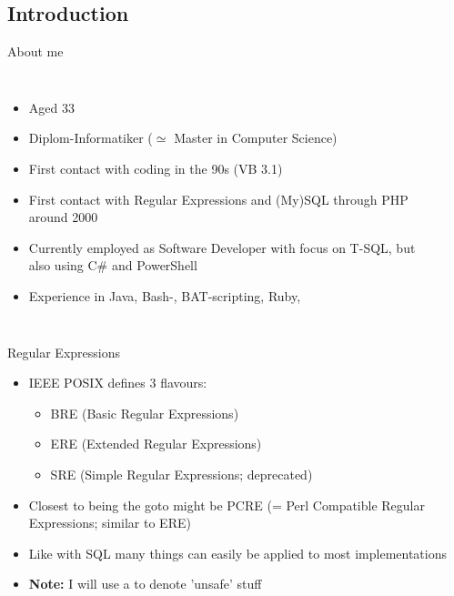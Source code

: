 \documentclass[english,aspectratio=169]{beamer}
\begin{document}
\subsection{Introduction}
\begin{frame}{About me}
\begin{columns}
        \begin{itemize}
            \item Aged 33
            \item Diplom-Informatiker ($\simeq$ Master in Computer Science)
            \item First contact with coding in the 90s (VB 3.1)
            \item First contact with Regular Expressions and (My)SQL through PHP around 2000
            \item Currently employed as Software Developer with focus on T-SQL, but also using C\# and PowerShell
            \item Experience in Java, Bash-, BAT-scripting, Ruby, \textellipsis
        \end{itemize}
        \begin{center}
            \hyperlink{https://www.youracclaim.com/badges/bd81bbb0-8416-40b7-bede-77e7f2b0d5cf}{ }
        \end{center}
        \begin{center}
        \end{center}
    \end{columns}
\end{frame}

\begin{frame}{Regular Expressions}

\begin{itemize}
\item IEEE POSIX defines 3 flavours: \cite{wiki}\\
    \begin{itemize}
    \item BRE (Basic Regular Expressions)
    \item ERE (Extended Regular Expressions)
    \item  SRE (Simple Regular Expressions; deprecated)
    \end{itemize}
\item Closest to being the goto might be PCRE (= Perl Compatible Regular Expressions; similar to ERE) \cite{wikiPCRE, pcre2syntax}
\item Like with SQL many things can easily be applied to most implementations
\item \textbf{Note:} I will use a \textdagger{} to denote 'unsafe' stuff
\end{itemize}
\end{frame}
\end{document}
